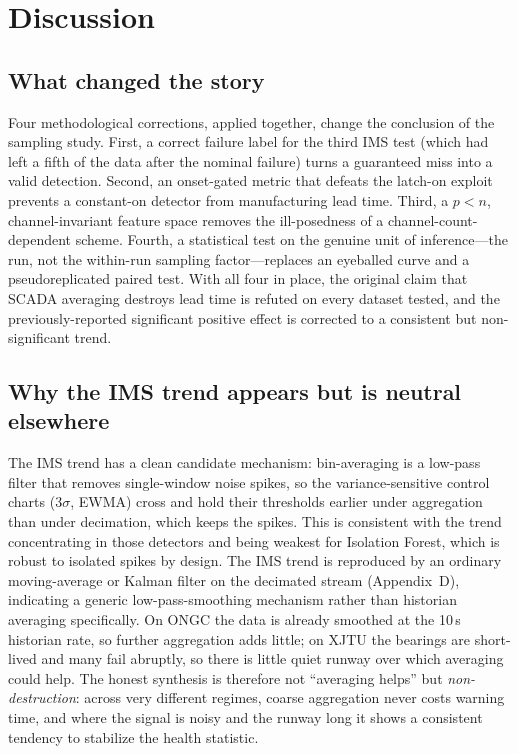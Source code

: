 \documentclass[journal]{IEEEtran}
\begin{document}
\section{Discussion}

\subsection{What changed the story}
Four methodological corrections, applied together, change the conclusion of the
sampling study. First, a correct failure label for the third IMS test (which had
left a fifth of the data after the nominal failure) turns a guaranteed miss into
a valid detection. Second, an onset-gated metric that defeats the latch-on
exploit prevents a constant-on detector from manufacturing lead time. Third, a
$p<n$, channel-invariant feature space removes the ill-posedness of a
channel-count-dependent scheme. Fourth, a statistical test on the genuine unit
of inference---the run, not the within-run sampling factor---replaces an
eyeballed curve and a pseudoreplicated paired test. With all four in place, the
original claim that SCADA averaging destroys lead time is refuted on every
dataset tested, and the previously-reported significant positive effect is corrected
to a consistent but non-significant trend.

\subsection{Why the IMS trend appears but is neutral elsewhere}
The IMS trend has a clean candidate mechanism: bin-averaging is a low-pass
filter that removes single-window noise spikes, so the variance-sensitive
control charts (3$\sigma$, EWMA) cross and hold their thresholds earlier under
aggregation than under decimation, which keeps the spikes. This is consistent
with the trend concentrating in those detectors and being weakest for Isolation
Forest, which is robust to isolated spikes by design. The IMS trend is reproduced by an ordinary moving-average or Kalman filter on the
decimated stream (Appendix~D), indicating a generic low-pass-smoothing mechanism
rather than historian averaging specifically. On ONGC the data is already
smoothed at the 10\,s historian rate, so further aggregation adds little; on
XJTU the bearings are short-lived and many fail abruptly, so there is little
quiet runway over which averaging could help. The honest synthesis is therefore
not ``averaging helps'' but \emph{non-destruction}: across very different
regimes, coarse aggregation never costs warning time, and where the signal is
noisy and the runway long it shows a consistent tendency to stabilize the health
statistic.
\end{document}
